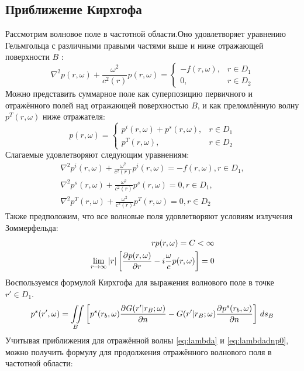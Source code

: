 \documentclass[a4paper, fontsize=14pt]{article}
\begin{document}
	\subsection{Приближение Кирхгофа}
	Рассмотрим волновое поле в частотной области.Оно удовлетворяет уравнению Гельмгольца с различными правыми частями выше и ниже отражающей поверхности $B$ \cite{zhdanov2007}:
	\begin{equation}
		\nabla^2 p(r,\omega) + \frac{\omega^2}{c^2(r)}p(r,\omega) = \begin{cases}
			-f(r,\omega), & r \in D_1 \\
			0,            & r \in D_2
		\end{cases}
		\label{eq:helmp}
	\end{equation} 
	Можно представить суммарное поле как суперпозицию первичного и отражённого полей над отражающей поверхностью $B$, и как преломлённую волну $p^T(r,\omega)$ ниже отражателя:
	\begin{equation}
		p(r,\omega) = \begin{cases}
			p^i(r,\omega)+p^s(r,\omega),& r \in D_1 \\
			p^T(r,\omega), & r \in D_2
		\end{cases}
	\end{equation}
	Слагаемые удовлетворяют следующим уравнениям:
	\begin{eqnarray}
		\nabla^2 p^i(r,\omega) + \frac{\omega^2}{c^2(r)}p^i(r,\omega) =-f(r,\omega), r \in D_1,\\
		\nabla^2 p^s(r,\omega) + \frac{\omega^2}{c^2(r)}p^s(r,\omega) = 0, r \in D_1,\\
		\nabla^2 p^T(r,\omega) + \frac{\omega^2}{c^2(r)}p^T(r,\omega) =0, r \in D_2
	\end{eqnarray}
	Также предположим, что все волновые поля удовлетворяют условиям излучения Зоммерфельда:
	\begin{eqnarray}
		rp(r,\omega) = C < \infty\\
		\lim\limits_{r\to\infty} |r|\left[\frac{\partial ^ {  } p(r,\omega)}{\partial r ^ {  } } - i\frac{\omega}{c}p(r,\omega)\right] =0
	\end{eqnarray}
	Воспользуемся формулой Кирхгофа для выражения волнового поле в точке $r'\in D_1$.
	\begin{equation}
		p^s(r',\omega)= \iint\limits_B \left[ p^s(r_b,\omega)\frac{\partial ^ {  }  G(r'|r_B;\omega)}{\partial n ^ {  } }- G(r'|r_B;\omega)\frac{\partial ^ {  } p^s(r_b,\omega)}{\partial n ^ {  } }\right] \,ds_B
	\end{equation}
	Учитывая приближения для отражённой волны \ref{eq:lambda} и \ref{eq:lambdadnp0}, можно получить формулу для продолжения отражённого волнового поля в частотной области:
\end{document}
